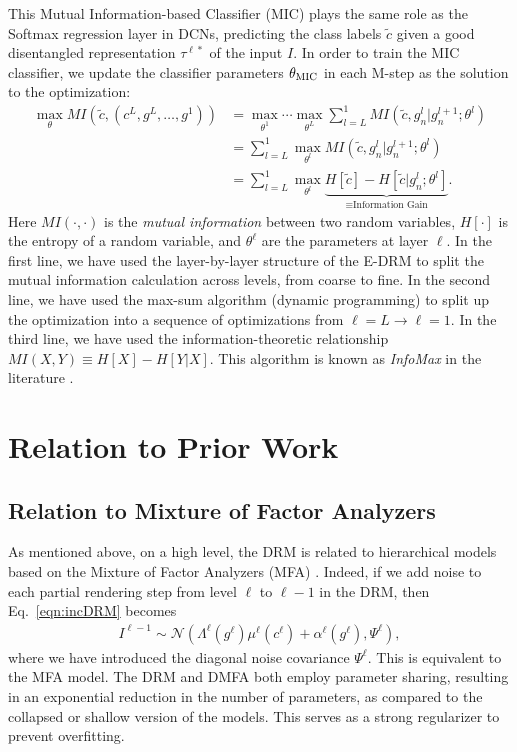 \documentclass[12pt]{article}
\begin{document}
This Mutual Information-based Classifier (MIC) plays the same role as the Softmax regression layer in DCNs, predicting the class labels $\tilde{c}$ given a good disentangled representation $\tau^{\ell *}$ of the input $I$. In order to train the MIC classifier, we update the classifier parameters $\theta_{\rm MIC}$ in each M-step as the solution to the optimization: 
\begin{align}
   \max_{\theta} MI(\tilde{c},(c^{L},g^{L},\ldots,g^{1}))
   & = \max_{\theta^{1}} \cdots \max_{\theta^{L}} \sum_{l=L}^{1} MI(\tilde{c},g_{n}^{l} | g_{n}^{l+1};\theta^{l})    \nonumber\\
   & = \sum_{l=L}^{1} \max_{\theta^{l}} MI(\tilde{c},g_{n}^{l} | g_{n}^{l+1};\theta^{l}) \nonumber\\
   & = \sum_{l=L}^{1} \max_{\theta^{l}} \underbrace{H[\tilde{c}] - H[\tilde{c} | g_{n}^{l};\theta^{l}]}_{\equiv \textrm{Information Gain}}.  
\end{align}
Here $MI(\cdot, \cdot)$ is the \emph{mutual information} between two random variables, $H[\cdot]$ is the entropy of a random variable, and $\theta^{\ell}$ are the parameters at layer $\ell$. In the first line, we have used the layer-by-layer structure of the E-DRM to split the mutual information calculation across levels, from coarse to fine. In the second line, we have used the max-sum algorithm (dynamic programming) to split up the optimization into a sequence of optimizations from $\ell = L \rightarrow \ell=1$. In the third line, we have used the information-theoretic relationship $MI(X,Y) \equiv H[X] - H[Y|X]$. This algorithm is known as \emph{InfoMax} in the literature \cite{criminisi2013decision}.

\section{Relation to Prior Work} \label{sec:RelatedWork}

\subsection{Relation to Mixture of Factor Analyzers}

As mentioned above, on a high level, the DRM is related to hierarchical models based on the Mixture of Factor Analyzers (MFA) \cite{ghahramani1996algorithm}. Indeed, if we add noise to each partial rendering step from level $\ell$ to $\ell-1$ in the DRM, then Eq.~\ref{eqn:incDRM} becomes
\begin{align}
	I^{\ell-1} \sim  \mathcal{N}\left(\Lambda^{\ell}(g^{\ell}) \mu^{\ell}(c^{\ell}) +  \alpha^{\ell}(g^{\ell}), \Psi^{\ell}\right),
\end{align}
where we have introduced the diagonal noise covariance $\Psi^{\ell}$. This is equivalent to the MFA model. 
The DRM and DMFA both employ parameter sharing, resulting in an exponential reduction in the number of parameters, as compared to the collapsed or shallow version of the models. This serves as a strong regularizer to prevent overfitting.
\end{document}
